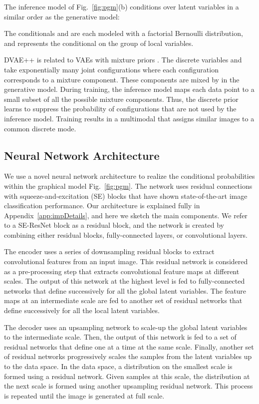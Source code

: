 \documentclass{article}
\begin{document}
The inference model of Fig.~\ref{fig:pgm}(b) conditions over latent variables in a similar order as the generative model:

The conditionals  and  are each modeled with a factorial Bernoulli distribution, and  represents the conditional on the  group of local variables.

DVAE++ is related to VAEs with mixture priors \cite{makhzani2015adversarial, tomczak2017vae}. 
The discrete variables  and  take exponentially many joint configurations where each configuration corresponds to a mixture component. These components are mixed by  in the generative model. During training, the inference model maps each data
point to a small subset of all the possible mixture components. Thus, the discrete prior learns to suppress the probability of configurations
that are not used by the inference model. Training results in a multimodal  that assigns similar images to a common discrete mode.

\subsection{Neural Network Architecture} \label{app:nnArch}
We use a novel neural network architecture to realize the conditional probabilities within the graphical model Fig.~\ref{fig:pgm}. The network uses residual connections \cite{he2016deep} with squeeze-and-excitation (SE) blocks \cite{hu2017squeeze} 
that have shown state-of-the-art image classification performance. Our architecture is explained fully in Appendix~\ref{app:impDetails}, and here we sketch the main components. We refer to a SE-ResNet block as a residual block, and the network is created by combining either residual blocks, fully-connected layers, or convolutional layers.

The encoder uses a series of downsampling residual blocks to extract convolutional features from an input image. This residual network is considered as a pre-processing step that extracts convolutional feature maps at different scales. 
The output of this network at the highest level is fed to
fully-connected networks that define  successively for all the global latent variables. 
The feature maps at an intermediate scale are fed to another set of residual networks that define  successively for all the local latent variables.

The decoder uses an upsampling network to scale-up the global latent variables to the intermediate scale. Then, the output of this network is fed to a set of residual networks that define  one at a time at the same scale. Finally, another set of residual networks progressively scales the samples from the latent variables up to the data space. In the data space, a distribution on the smallest scale  is formed using a residual network. Given samples at this scale, the distribution at the
next scale is formed using another upsampling residual network. This process is repeated until the image is generated at full scale. 
\end{document}
